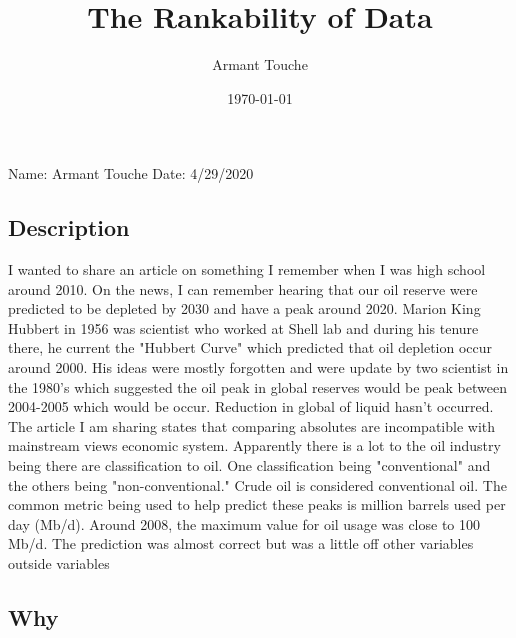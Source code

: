 \documentclass[a4paper,man,biblatex]{apa6}
\title{The Rankability of Data}
\author{Armant Touche}
\affiliation{Portland State University}
\date{\today}
\begin{document}
\thispagestyle{otherpage}
\setcounter{biburllcpenalty}{7000}
\setcounter{biburlucpenalty}{8000}


\noindent Name: Armant Touche\newline
\noindent Date: 4/29/2020

\subsection{Description} I wanted to share an article on something I remember when I was high school around 2010. On the news, I can remember hearing that our oil reserve were predicted to be depleted by 2030 and have a peak around 2020. Marion King Hubbert in 1956 was scientist who worked at Shell lab and during his tenure there, he current the "Hubbert Curve" which predicted that oil depletion occur around 2000. His ideas were mostly forgotten and were update by two scientist in the 1980's which suggested the oil peak in global reserves would be peak between 2004-2005 which would be occur. Reduction in global of liquid hasn't occurred. The article I am sharing states that comparing absolutes are incompatible with mainstream views economic system. Apparently there is a lot to the oil industry being there are classification to oil. One classification being "conventional" and the others being "non-conventional." Crude oil is considered conventional oil. The common metric being used to help predict these peaks is million barrels used per day (Mb/d). Around 2008, the maximum value for oil usage was close to 100 Mb/d. The prediction was almost correct but was a little off other variables outside variables


\subsection{Why} 

\printbibliography
\end{document}
